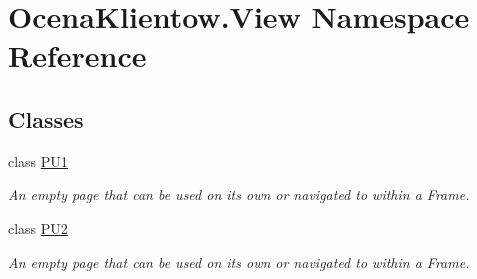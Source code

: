 \hypertarget{namespace_ocena_klientow_1_1_view}{}\section{Ocena\+Klientow.\+View Namespace Reference}
\label{namespace_ocena_klientow_1_1_view}
\subsection*{Classes}
\begin{DoxyCompactItemize}
\item 
class \hyperlink{class_ocena_klientow_1_1_view_1_1_p_u1}{P\+U1}
\begin{DoxyCompactList}\small\item\em An empty page that can be used on its own or navigated to within a Frame. \end{DoxyCompactList}\item 
class \hyperlink{class_ocena_klientow_1_1_view_1_1_p_u2}{P\+U2}
\begin{DoxyCompactList}\small\item\em An empty page that can be used on its own or navigated to within a Frame. \end{DoxyCompactList}\end{DoxyCompactItemize}
